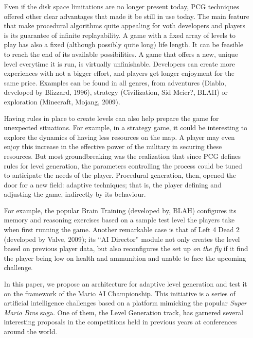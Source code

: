 \documentclass[conference]{IEEEtran}
\begin{document}
Even if the disk space limitations are no longer present today, PCG techniques offered other clear advantages that made it be still in use today. The main feature that make procedural algorithms quite appealing for voth developers and players is its guarantee of infinite replayability. A game with a fixed array of levels to play has also a fixed (although possibly quite long) life length. It can be feasible to reach the end of its available possibilities. A game that offers a new, unique level everytime it is run, is virtually unfinishable. Developers can create more experiences with not a bigger effort, and players get longer enjoyment for the same price. Examples can be found in all genres, from adventures (Diablo, developed by Blizzard, 1996), strategy (Civilization, Sid Meier?, BLAH) or exploration (Minecraft, Mojang, 2009).

Having rules in place to create levels can also help prepare the game for unexpected situations. For example, in a strategy game, it could be interesting to explore the dynamics of having less resources on the map. A player may even enjoy this increase in the effective power of the military in securing these resources. But most groundbreaking was the realization that since PCG defines rules for level generation, the parameters controlling the process could be tuned to anticipate the needs of the player. Procedural generation, then, opened the door for a new field: adaptive techniques; that is, the player defining and adjusting the game, indirectly by its behaviour. 

For example, the popular Brain Training (developed by, BLAH) configures its memory and reasoning exercises based on a sample test level the players take when first running the game. Another remarkable case is that of Left 4 Dead 2 (developed by Valve, 2009); its ``AI Director'' module not only creates the level based on previous player data, but also reconfigures the set up \textit{on the fly} if it find the player being low on health and ammunition and unable to face the upcoming challenge.

In this paper, we propose an architecture for adaptive level generation and test it on the framework of the Mario AI Championship. This initiative is a series of artificial intelligence challenges based on a platform mimicking the popular \textit{Super Mario Bros} saga. One of them, the Level Generation track, has garnered several interesting proposals in the competitions held in previous years at conferences around the world.
\end{document}
